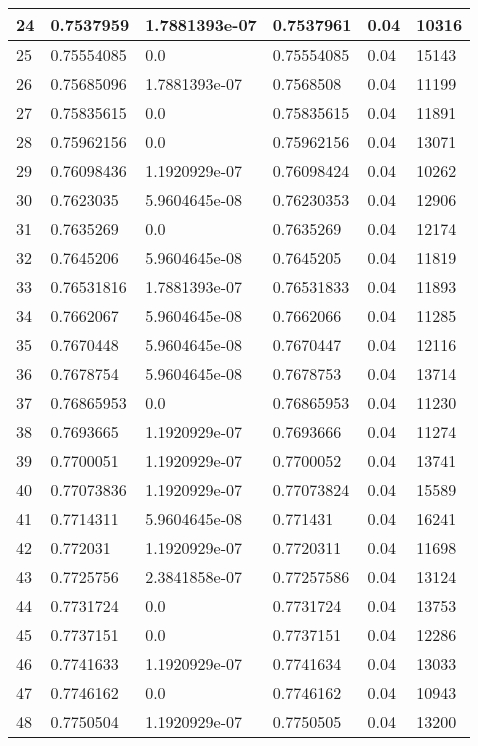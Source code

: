 \begin{longtable}{|l|l|l|l|l|l|}
24 & 0.7537959 & 1.7881393e-07 & 0.7537961 & 0.04 & 10316 \\ \hline 
25 & 0.75554085 & 0.0 & 0.75554085 & 0.04 & 15143 \\ \hline 
26 & 0.75685096 & 1.7881393e-07 & 0.7568508 & 0.04 & 11199 \\ \hline 
27 & 0.75835615 & 0.0 & 0.75835615 & 0.04 & 11891 \\ \hline 
28 & 0.75962156 & 0.0 & 0.75962156 & 0.04 & 13071 \\ \hline 
29 & 0.76098436 & 1.1920929e-07 & 0.76098424 & 0.04 & 10262 \\ \hline 
30 & 0.7623035 & 5.9604645e-08 & 0.76230353 & 0.04 & 12906 \\ \hline 
31 & 0.7635269 & 0.0 & 0.7635269 & 0.04 & 12174 \\ \hline 
32 & 0.7645206 & 5.9604645e-08 & 0.7645205 & 0.04 & 11819 \\ \hline 
33 & 0.76531816 & 1.7881393e-07 & 0.76531833 & 0.04 & 11893 \\ \hline 
34 & 0.7662067 & 5.9604645e-08 & 0.7662066 & 0.04 & 11285 \\ \hline 
35 & 0.7670448 & 5.9604645e-08 & 0.7670447 & 0.04 & 12116 \\ \hline 
36 & 0.7678754 & 5.9604645e-08 & 0.7678753 & 0.04 & 13714 \\ \hline 
37 & 0.76865953 & 0.0 & 0.76865953 & 0.04 & 11230 \\ \hline 
38 & 0.7693665 & 1.1920929e-07 & 0.7693666 & 0.04 & 11274 \\ \hline 
39 & 0.7700051 & 1.1920929e-07 & 0.7700052 & 0.04 & 13741 \\ \hline 
40 & 0.77073836 & 1.1920929e-07 & 0.77073824 & 0.04 & 15589 \\ \hline 
41 & 0.7714311 & 5.9604645e-08 & 0.771431 & 0.04 & 16241 \\ \hline 
42 & 0.772031 & 1.1920929e-07 & 0.7720311 & 0.04 & 11698 \\ \hline 
43 & 0.7725756 & 2.3841858e-07 & 0.77257586 & 0.04 & 13124 \\ \hline 
44 & 0.7731724 & 0.0 & 0.7731724 & 0.04 & 13753 \\ \hline 
45 & 0.7737151 & 0.0 & 0.7737151 & 0.04 & 12286 \\ \hline 
46 & 0.7741633 & 1.1920929e-07 & 0.7741634 & 0.04 & 13033 \\ \hline 
47 & 0.7746162 & 0.0 & 0.7746162 & 0.04 & 10943 \\ \hline 
48 & 0.7750504 & 1.1920929e-07 & 0.7750505 & 0.04 & 13200 \\ \hline 

\end{longtable}
